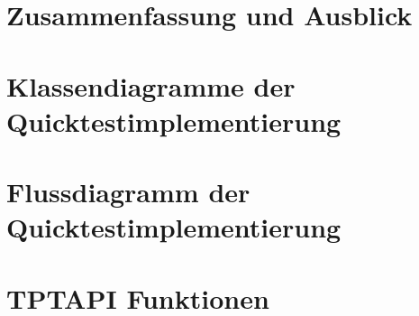 		
	\chapter{Zusammenfassung und Ausblick}
		
		\label{LastPage}
		\setcounter{letzte}{\value{page}}
		
		
	
			
		\setcounter{page}{\value{generell}}
		
	\listoffigures
	\lstlistoflistings
	\appendix
		\chapter{Klassendiagramme der Quicktestimplementierung}
			
		\chapter{Flussdiagramm der Quicktestimplementierung}
			
		\chapter{TPTAPI Funktionen}
			

	\printbibliography

